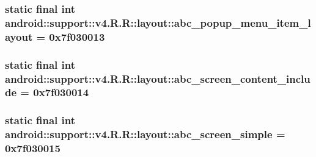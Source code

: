 \hypertarget{classandroid_1_1support_1_1v4_1_1_r_1_1layout_d2fb3d5b495782de79b20877953e3134}{
\subsubsection[{abc\_\-popup\_\-menu\_\-item\_\-layout}]{\setlength{\rightskip}{0pt plus 5cm}static final int android::support::v4.R.R::layout::abc\_\-popup\_\-menu\_\-item\_\-layout = 0x7f030013}}
\label{classandroid_1_1support_1_1v4_1_1_r_1_1layout_d2fb3d5b495782de79b20877953e3134}


\hypertarget{classandroid_1_1support_1_1v4_1_1_r_1_1layout_0c2356b8593e0cfb36dd286e6c41317f}{
\subsubsection[{abc\_\-screen\_\-content\_\-include}]{\setlength{\rightskip}{0pt plus 5cm}static final int android::support::v4.R.R::layout::abc\_\-screen\_\-content\_\-include = 0x7f030014}}
\label{classandroid_1_1support_1_1v4_1_1_r_1_1layout_0c2356b8593e0cfb36dd286e6c41317f}


\hypertarget{classandroid_1_1support_1_1v4_1_1_r_1_1layout_4eed0bc6f34dd3357603b614efae0869}{
\subsubsection[{abc\_\-screen\_\-simple}]{\setlength{\rightskip}{0pt plus 5cm}static final int android::support::v4.R.R::layout::abc\_\-screen\_\-simple = 0x7f030015}}
\label{classandroid_1_1support_1_1v4_1_1_r_1_1layout_4eed0bc6f34dd3357603b614efae0869}


